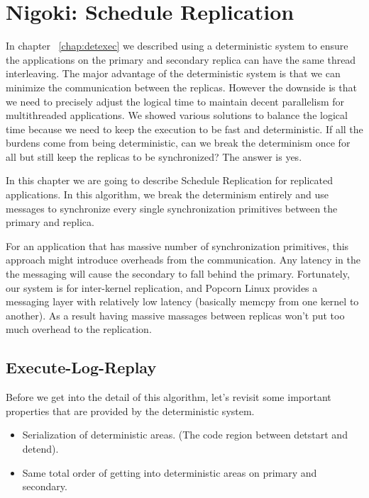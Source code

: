\chapter{Nigoki: Schedule Replication} \label{chap:schedrep}
In chapter ~\ref{chap:detexec} we described using a deterministic system to ensure the applications on the primary and secondary replica can have the same thread interleaving. The major advantage of the deterministic system is that we can minimize the communication between the replicas. However the downside is that we need to precisely adjust the logical time to maintain decent parallelism for multithreaded applications. We showed various solutions to balance the logical time because we need to keep the execution to be fast and deterministic. If all the burdens come from being deterministic, can we break the determinism once for all but still keep the replicas to be synchronized? The answer is yes.

In this chapter we are going to describe Schedule Replication for replicated applications. In this algorithm, we break the determinism entirely and use messages to synchronize every single synchronization primitives between the primary and replica.

For an application that has massive number of synchronization primitives, this approach might introduce overheads from the communication. Any latency in the the messaging will cause the secondary to fall behind the primary. Fortunately, our system is for inter-kernel replication, and Popcorn Linux provides a messaging layer with relatively low latency (basically memcpy from one kernel to another). As a result having massive massages between replicas won't put too much overhead to the replication.


\section{Execute-Log-Replay}
Before we get into the detail of this algorithm, let's revisit some important properties that are provided by the deterministic system.

\begin{itemize}
\item Serialization of deterministic areas. (The code region between detstart and detend).
\item Same total order of getting into deterministic areas on primary and secondary.
\end{itemize}

